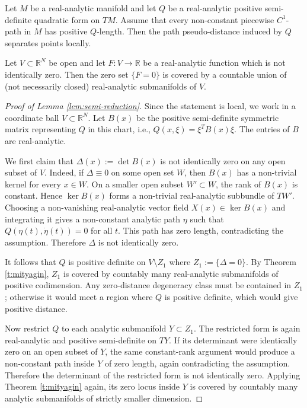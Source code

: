 \documentclass[10pt,a4paper]{amsart}
\begin{document}
\begin{lem}\label{lem:semi-reduction}
Let $M$ be a real-analytic manifold and let $Q$ be a real-analytic
positive semi-definite quadratic form on $TM$. Assume that every non-constant
piecewise $C^1$-path in $M$ has positive $Q$-length. Then the path
pseudo-distance induced by $Q$ separates points locally.
\end{lem}

\begin{thm}[Mityagin]\label{t:mityagin}
Let $V\subset\mathbb R^N$ be open and let
$F\colon V\to\mathbb R$
be a real-analytic function which is not identically zero. Then the zero set
$\{F=0\}$
is covered by a countable union of 
(not necessarily closed) real-analytic submanifolds of $V$.
\end{thm}

\begin{proof}[Proof of Lemma \ref{lem:semi-reduction}]
Since the statement is local, we work in a coordinate ball
$V\subset\mathbb R^N$.
Let $B(x)$ be the positive semi-definite symmetric matrix representing $Q$
in this chart, i.e.,
$Q(x,\xi)=\xi^T B(x)\xi$.
The entries of $B$ are real-analytic.

We first claim that
$\Delta(x):=\det B(x)$
is not identically zero on any open subset of $V$. Indeed, if
$\Delta\equiv0$ on some open set $W$, then $B(x)$ has a non-trivial kernel
for every $x\in W$. On a smaller open subset $W'\subset W$, the rank of
$B(x)$ is constant. Hence $\ker B(x)$ forms a non-trivial real-analytic
subbundle of $TW'$. Choosing a non-vanishing real-analytic vector field
$X(x)\in\ker B(x)$ and integrating it gives a non-constant analytic path
$\eta$ such that
$Q(\eta(t),\dot\eta(t))=0$
for all $t$. This path has zero length, contradicting the assumption.
Therefore $\Delta$ is not identically zero.

It follows that $Q$ is positive definite on
$V\setminus Z_1$ where $Z_1:=\{\Delta=0\}$.
By Theorem
\ref{t:mityagin}, $Z_1$ is covered by countably many real-analytic
submanifolds of positive codimension. Any zero-distance degeneracy class must
be contained in $Z_1$; otherwise it would meet a region where $Q$ is
positive definite, which 
would give positive
distance.

Now restrict $Q$ to each analytic submanifold $Y\subset Z_1$. The restricted
form is again real-analytic and positive semi-definite on $TY$. If its
determinant were identically zero on an open subset of $Y$, the same
constant-rank argument would produce a non-constant path inside $Y$ of zero
length, again contradicting the assumption. Therefore the determinant of the
restricted form is not identically zero. Applying 
Theorem  \ref{t:mityagin} again, 
its
zero locus inside $Y$ is covered by countably many analytic submanifolds of
strictly smaller dimension.


\end{proof}
\end{document}
